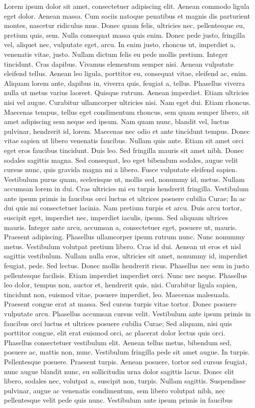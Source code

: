 Lorem ipsum dolor sit amet, consectetuer adipiscing elit. Aenean commodo ligula eget dolor. Aenean massa. Cum sociis natoque penatibus et magnis dis parturient montes, nascetur ridiculus mus. Donec quam felis, ultricies nec, pellentesque eu, pretium quis, sem. Nulla consequat massa quis enim. Donec pede justo, fringilla vel, aliquet nec, vulputate eget, arcu. In enim justo, rhoncus ut, imperdiet a, venenatis vitae, justo. Nullam dictum felis eu pede mollis pretium. Integer tincidunt. Cras dapibus. Vivamus elementum semper nisi. Aenean vulputate eleifend tellus. Aenean leo ligula, porttitor eu, consequat vitae, eleifend ac, enim. Aliquam lorem ante, dapibus in, viverra quis, feugiat a, tellus. Phasellus viverra nulla ut metus varius laoreet. Quisque rutrum. Aenean imperdiet. Etiam ultricies nisi vel augue. Curabitur ullamcorper ultricies nisi. Nam eget dui. Etiam rhoncus. Maecenas tempus, tellus eget condimentum rhoncus, sem quam semper libero, sit amet adipiscing sem neque sed ipsum. Nam quam nunc, blandit vel, luctus pulvinar, hendrerit id, lorem. Maecenas nec odio et ante tincidunt tempus. Donec vitae sapien ut libero venenatis faucibus. Nullam quis ante. Etiam sit amet orci eget eros faucibus tincidunt. Duis leo. Sed fringilla mauris sit amet nibh. Donec sodales sagittis magna. Sed consequat, leo eget bibendum sodales, augue velit cursus nunc, quis gravida magna mi a libero. Fusce vulputate eleifend sapien. Vestibulum purus quam, scelerisque ut, mollis sed, nonummy id, metus. Nullam accumsan lorem in dui. Cras ultricies mi eu turpis hendrerit fringilla. Vestibulum ante ipsum primis in faucibus orci luctus et ultrices posuere cubilia Curae; In ac dui quis mi consectetuer lacinia. Nam pretium turpis et arcu. Duis arcu tortor, suscipit eget, imperdiet nec, imperdiet iaculis, ipsum. Sed aliquam ultrices mauris. Integer ante arcu, accumsan a, consectetuer eget, posuere ut, mauris. Praesent adipiscing. Phasellus ullamcorper ipsum rutrum nunc. Nunc nonummy metus. Vestibulum volutpat pretium libero. Cras id dui. Aenean ut eros et nisl sagittis vestibulum. Nullam nulla eros, ultricies sit amet, nonummy id, imperdiet feugiat, pede. Sed lectus. Donec mollis hendrerit risus. Phasellus nec sem in justo pellentesque facilisis. Etiam imperdiet imperdiet orci. Nunc nec neque. Phasellus leo dolor, tempus non, auctor et, hendrerit quis, nisi. Curabitur ligula sapien, tincidunt non, euismod vitae, posuere imperdiet, leo. Maecenas malesuada. Praesent congue erat at massa. Sed cursus turpis vitae tortor. Donec posuere vulputate arcu. Phasellus accumsan cursus velit. Vestibulum ante ipsum primis in faucibus orci luctus et ultrices posuere cubilia Curae; Sed aliquam, nisi quis porttitor congue, elit erat euismod orci, ac placerat dolor lectus quis orci. Phasellus consectetuer vestibulum elit. Aenean tellus metus, bibendum sed, posuere ac, mattis non, nunc. Vestibulum fringilla pede sit amet augue. In turpis. Pellentesque posuere. Praesent turpis. Aenean posuere, tortor sed cursus feugiat, nunc augue blandit nunc, eu sollicitudin urna dolor sagittis lacus. Donec elit libero, sodales nec, volutpat a, suscipit non, turpis. Nullam sagittis. Suspendisse pulvinar, augue ac venenatis condimentum, sem libero volutpat nibh, nec pellentesque velit pede quis nunc. Vestibulum ante ipsum primis in faucibus 